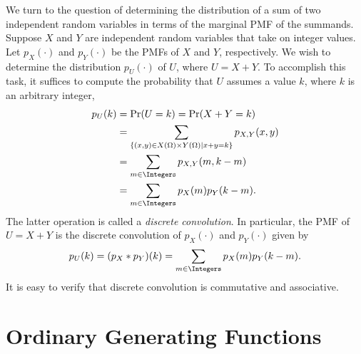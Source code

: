 We turn to the question of determining the distribution of a sum of two independent random variables in terms of the marginal PMF of the summands.
Suppose $X$ and $Y$ are independent random variables that take on integer values.
Let $p_X(\cdot)$ and $p_Y(\cdot)$ be the PMFs of $X$ and $Y$, respectively.
We wish to determine the distribution $p_U (\cdot)$ of $U$, where $U = X + Y$.
To accomplish this task, it suffices to compute the probability that $U$ assumes a value $k$, where $k$ is an arbitrary integer,
\begin{equation*}
\begin{split}
p_U (k) &= \Pr (U = k) = \Pr (X + Y = k) \\
&= \sum_{ \{ (x,y) \in X(\Omega) \times Y(\Omega) | x + y = k \} } p_{X,Y} (x, y) \\
&= \sum_{ m \in \Integers } p_{X,Y} (m, k-m) \\
&= \sum_{ m \in \Integers } p_X (m) p_Y(k-m) .
\end{split}
\end{equation*}
The latter operation is called a \emph{discrete convolution}. 
In particular, the PMF of $U = X + Y$ is the discrete convolution of $p_X (\cdot)$ and $p_Y (\cdot)$ given by
\begin{equation} \label{equation:DiscreteConvolution}
p_U(k) = (p_X \ast p_Y)(k)
= \sum_{m \in \Integers } p_X(m) p_Y(k-m) .
\end{equation}
It is easy to verify that discrete convolution is commutative and associative.

\section{Ordinary Generating Functions}
\label{section:OrdinaryGeneratingFunctions}

